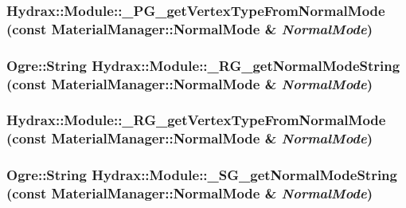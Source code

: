 \hypertarget{namespace_hydrax_1_1_module_07a83b9ab2c8e9cfedcd22c258f195db}{
\subsubsection[{\_\-PG\_\-getVertexTypeFromNormalMode}]{ Hydrax::Module::\_\-PG\_\-getVertexTypeFromNormalMode (const MaterialManager::NormalMode \& {\em NormalMode})}}
\label{namespace_hydrax_1_1_module_07a83b9ab2c8e9cfedcd22c258f195db}


\hypertarget{namespace_hydrax_1_1_module_9d0a111b6faa09264b20e9fa08206d1c}{
\subsubsection[{\_\-RG\_\-getNormalModeString}]{\setlength{\rightskip}{0pt plus 5cm}Ogre::String Hydrax::Module::\_\-RG\_\-getNormalModeString (const MaterialManager::NormalMode \& {\em NormalMode})}}
\label{namespace_hydrax_1_1_module_9d0a111b6faa09264b20e9fa08206d1c}


\hypertarget{namespace_hydrax_1_1_module_d1ad011be1214d5b2f3f23d8b2096f5b}{
\subsubsection[{\_\-RG\_\-getVertexTypeFromNormalMode}]{ Hydrax::Module::\_\-RG\_\-getVertexTypeFromNormalMode (const MaterialManager::NormalMode \& {\em NormalMode})}}
\label{namespace_hydrax_1_1_module_d1ad011be1214d5b2f3f23d8b2096f5b}


\hypertarget{namespace_hydrax_1_1_module_8a59e685690840e8bfa83fe392c795af}{
\subsubsection[{\_\-SG\_\-getNormalModeString}]{\setlength{\rightskip}{0pt plus 5cm}Ogre::String Hydrax::Module::\_\-SG\_\-getNormalModeString (const MaterialManager::NormalMode \& {\em NormalMode})}}
\label{namespace_hydrax_1_1_module_8a59e685690840e8bfa83fe392c795af}


